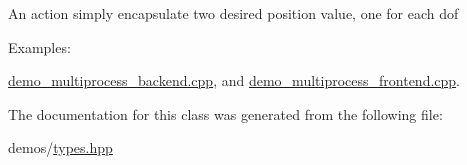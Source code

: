 An action simply encapsulate two desired position value, one for each dof \begin{Desc}
\item[Examples\+: ]\par
\hyperlink{demo_multiprocess_backend_8cpp-example}{demo\+\_\+multiprocess\+\_\+backend.\+cpp}, and \hyperlink{demo_multiprocess_frontend_8cpp-example}{demo\+\_\+multiprocess\+\_\+frontend.\+cpp}.\end{Desc}


The documentation for this class was generated from the following file\+:\begin{DoxyCompactItemize}
\item 
demos/\hyperlink{demos_2types_8hpp}{types.\+hpp}\end{DoxyCompactItemize}
